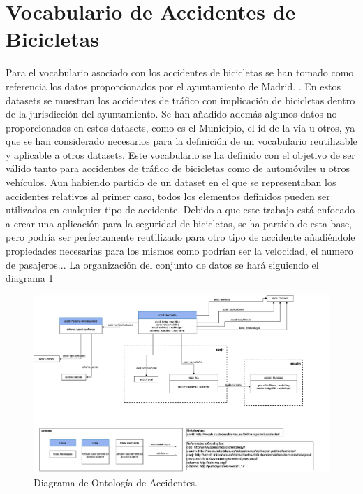 \section{Vocabulario de Accidentes de Bicicletas}

Para el vocabulario asociado con los accidentes de bicicletas se han tomado como referencia los datos proporcionados por el ayuntamiento de Madrid.  \cite{datosMadrid_accidentesDeBicicleta}. En estos datasets se muestran los accidentes de tráfico con implicación de bicicletas dentro de la jurisdicción del ayuntamiento.
\newline
Se han añadido además algunos datos no proporcionados en estos datasets, como es el Municipio, el id de la vía u otros, ya que se han considerado necesarios para la definición de un vocabulario reutilizable y aplicable a otros datasets.
\newline
Este vocabulario se ha definido con el objetivo de ser válido tanto para accidentes de tráfico de bicicletas como de automóviles u otros vehículos. Aun habiendo partido de un dataset en el que se representaban los accidentes relativos al primer caso, todos los elementos definidos pueden ser utilizados en cualquier tipo de accidente. Debido a que este trabajo está enfocado a crear una aplicación para la seguridad de bicicletas, se ha partido de esta base, pero podría ser perfectamente reutilizado para otro tipo de accidente añadiéndole propiedades necesarias para los mismos como podrían ser la velocidad, el numero de pasajeros...
\newline
La organización del conjunto de datos se hará siguiendo el diagrama \ref{fig:diagramaOntologAccid}

\begin{figure}[h]
	\centering
	\includegraphics[angle=0, width=1\textwidth]{images/diagramaAccidBici.png}  
	
	\caption{Diagrama de Ontología de Accidentes.}
	\label{fig:diagramaOntologAccid}
\end{figure}


